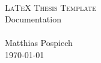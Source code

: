 
\begin{titlepage}
   \mbox{}\vspace{5\baselineskip}\\
   \rmfamily\huge
   \centering
   \textsc{\LaTeX{} Thesis Template} \\[2ex]
   Documentation
   \rmfamily\Large
   \vspace{1\baselineskip}\\
   \mbox{}
   \vspace{5\baselineskip}\\
   \rmfamily\Large
   Matthias Pospiech
   \vspace{1\baselineskip}\\
   \today
\end{titlepage}
 
 
